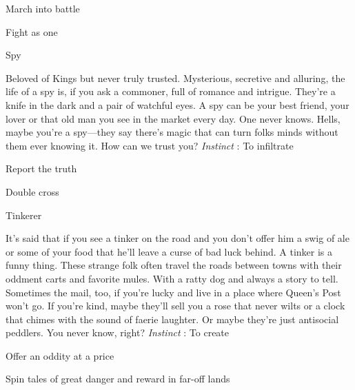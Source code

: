 \startitemize[1,packed]
         
\item March into battle

         
\item Fight as one

       
\stopitemize
       
\startMonsterName
Spy	
\stopMonsterName
       
\startMonsterDescription
Beloved of Kings but never truly trusted. Mysterious, secretive and alluring, the life of a spy is, if you ask a commoner, full of romance and intrigue. They’re a knife in the dark and a pair of watchful eyes. A spy can be your best friend, your lover or that old man you see in the market every day. One never knows. Hells, maybe you’re a spy—they say there’s magic that can turn folks minds without them ever knowing it. How can we trust you? {\em Instinct} : To infiltrate
\stopMonsterDescription
       
\startitemize[1,packed]
         
\item Report the truth

         
\item Double cross

       
\stopitemize
       
\startMonsterName
Tinkerer	
\stopMonsterName
       
\startMonsterDescription
It’s said that if you see a tinker on the road and you don’t offer him a swig of ale or some of your food that he’ll leave a curse of bad luck behind. A tinker is a funny thing. These strange folk often travel the roads between towns with their oddment carts and favorite mules. With a ratty dog and always a story to tell. Sometimes the mail, too, if you’re lucky and live in a place where Queen’s Post won’t go. If you’re kind, maybe they’ll sell you a rose that never wilts or a clock that chimes with the sound of faerie laughter. Or maybe they’re just antisocial peddlers. You never know, right? {\em Instinct} : To create
\stopMonsterDescription
       
\startitemize[1,packed]
         
\item Offer an oddity at a price

         
\item Spin tales of great danger and reward in far-off lands

       
\stopitemize
                
